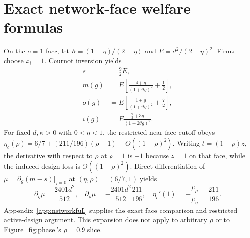 \documentclass[11pt,a4paper]{article}
\theoremstyle{remark}\newtheorem{remark}[theorem]{Remark}
\begin{document}
\section{Exact network-face welfare formulas}\label{app:network}
On the $\rho=1$ face, let $\vartheta=(1-\eta)/(2-\eta)$ and $E=d^2/(2-\eta)^2$. Firms choose $x_i=1$. Cournot inversion yields
\begin{equation}\label{eq:face}
\begin{split}
s&=\tfrac92 E,\\
m(g)&=E\left[\frac{4+g}{(1+\vartheta g)^2}+\tfrac12\right],\\
o(g)&=E\left[\frac{1+g}{(1+\vartheta g)^2}+\tfrac72\right],\\
i(g)&=E\frac{\tfrac92+3g}{(1+2\vartheta g)^2}.
\end{split}
\end{equation}
For fixed $d,\kappa>0$ with $0<\eta<1$, the restricted near-face cutoff obeys $\eta_c(\rho)=6/7+(211/196)(\rho-1)+O((1-\rho)^2)$. Writing $t=(1-\rho)z$, the derivative with respect to $\rho$ at $\rho=1$ is $-1$ because $z=1$ on that face, while the induced-design loss is $O((1-\rho)^2)$. Direct differentiation of $\mu=\partial_g(m-s)|_{g=0}$ at $(\eta,\rho)=(6/7,1)$ yields
\begin{equation}\label{eq:faceCutoffDerivative}
\partial_\eta\mu=\frac{2401d^2}{512},\quad
\partial_\rho\mu=-\frac{2401d^2}{512}\frac{211}{196},
\quad \eta_c'(1)=-\frac{\mu_\rho}{\mu_\eta}=\frac{211}{196}.
\end{equation}
Appendix~\ref{app:networkfull} supplies the exact face comparison and restricted active-design argument. This expansion does not apply to arbitrary $\rho$ or to Figure~\ref{fig:phase}'s $\rho=0.9$ slice.


\end{document}
